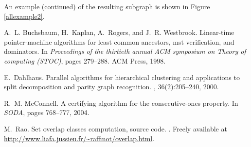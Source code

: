 \documentclass{llncs}
\begin{document}
\noindent
An example (continued) of the resulting subgraph is shown in Figure
\ref{allexample2}.

\begin{thebibliography}{1}

A.~L. Buchsbaum, H.~Kaplan, A.~Rogers, and J.~R. Westbrook.
\newblock Linear-time pointer-machine algorithms for least common ancestors,
  mst verification, and dominators.
\newblock In {\em Proceedings of the thirtieth annual ACM symposium on Theory
  of computing (STOC)}, pages 279--288. ACM Press, 1998.

E.~Dahlhaus.
\newblock Parallel algorithms for hierarchical clustering and applications to
  split decomposition and parity graph recognition.
, 36(2):205--240, 2000.

R.~M. McConnell.
\newblock A certifying algorithm for the consecutive-ones property.
\newblock In {\em SODA}, pages 768--777, 2004.

M.~Rao.
\newblock Set overlap classes computation, source code.
.
\newblock Freely available at
  \url{http://www.liafa.jussieu.fr/~raffinot/overlap.html}.

\end{thebibliography}
\end{document}
